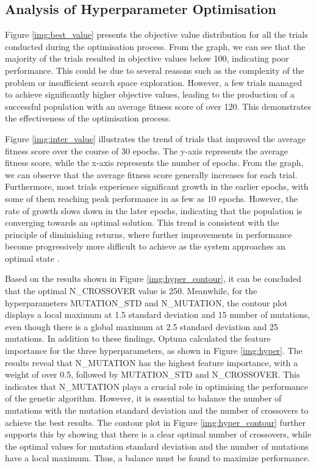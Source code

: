 \documentclass{IEEEtran}
\begin{document}
\subsection{Analysis of Hyperparameter Optimisation} \label{analyse_hyperparameters}
Figure \ref{img:best_value} presents the objective value distribution for all the trials conducted during the optimisation process. From the graph, we can see that the majority of the trials resulted in objective values below 100, indicating poor performance. This could be due to several reasons such as the complexity of the problem or insufficient search space exploration. However, a few trials managed to achieve significantly higher objective values, leading to the production of a successful population with an average fitness score of over 120. This demonstrates the effectiveness of the optimisation process.

Figure \ref{img:inter_value} illustrates the trend of trials that improved the average fitness score over the course of 30 epochs. The y-axis represents the average fitness score, while the x-axis represents the number of epochs. From the graph, we can observe that the average fitness score generally increases for each trial. Furthermore, most trials experience significant growth in the earlier epochs, with some of them reaching peak performance in as few as 10 epochs. However, the rate of growth slows down in the later epochs, indicating that the population is converging towards an optimal solution. This trend is consistent with the principle of diminishing returns, where further improvements in performance become progressively more difficult to achieve as the system approaches an optimal state \cite{wiki:diminishing-returns}.

Based on the results shown in Figure \ref{img:hyper_contour}, it can be concluded that the optimal N\_CROSSOVER value is 250. Meanwhile, for the hyperparameters MUTATION\_STD and N\_MUTATION, the contour plot displays a local maximum at 1.5 standard deviation and 15 number of mutations, even though there is a global maximum at 2.5 standard deviation and 25 mutations. In addition to these findings, Optuna calculated the feature importance for the three hyperparameters, as shown in Figure \ref{img:hyper}. The results reveal that N\_MUTATION has the highest feature importance, with a weight of over 0.5, followed by MUTATION\_STD and N\_CROSSOVER. This indicates that N\_MUTATION plays a crucial role in optimising the performance of the genetic algorithm. However, it is essential to balance the number of mutations with the mutation standard deviation and the number of crossovers to achieve the best results. The contour plot in Figure \ref{img:hyper_contour} further supports this by showing that there is a clear optimal number of crossovers, while the optimal values for mutation standard deviation and the number of mutations have a local maximum. Thus, a balance must be found to maximize performance.
\end{document}
